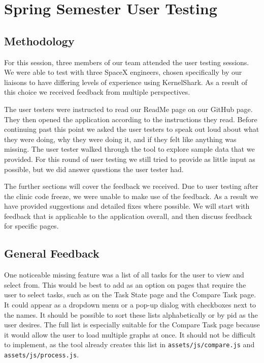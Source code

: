 \documentclass{hmcclinic}
\begin{document}
\chapter{Spring Semester User Testing}
\section{Methodology}
   For this session, three members of our team attended the user testing sessions.
   We were able to test with three SpaceX engineers, chosen specifically by our
   liaisons to have differing levels of experience using KernelShark. As a result of
   this choice we received feedback from multiple perspectives.

   The user testers were instructed to read our ReadMe page on our GitHub page. They
   then opened the application according to the instructions they read. Before continuing
   past this point we asked the user testers to speak out loud about what they were
   doing, why they were doing it, and if they felt like anything was missing. The user tester
   walked through the tool to explore sample data that we provided. For this round of
   user testing we still tried to provide as little input as possible, but we did answer
   questions the user tester had.

   The further sections will cover the feedback we received. Due to user testing after the
   clinic code freeze, we were unable to make use of the feedback. As a result we have provided
   suggestions and detailed fixes where possible. We will start with feedback that is applicable
   to the application overall, and then discuss feedback for specific pages.

\section{General Feedback}

One noticeable missing feature was a list of all tasks for the user to view and select from. 
This would be best to add as an option on pages that require the user to select tasks, such 
as on the Task State page and the Compare Task page. It could appear as a dropdown menu or a 
pop-up dialog with checkboxes next to the names. It should be possible to sort these lists 
alphabetically or by pid as the user desires. The full list is especially suitable for the 
Compare Task page because it would allow the user to load multiple graphs at once. It should 
not be difficult to implement, as the tool already creates this list in 
\texttt{assets/js/compare.js} and \texttt{assets/js/process.js}.
\end{document}
